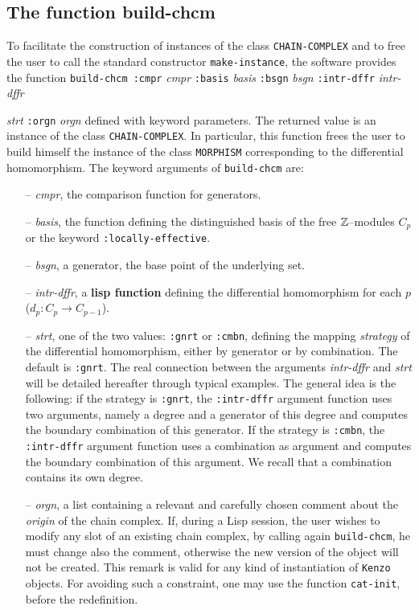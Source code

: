 \subsection {The function build-chcm}

To facilitate the construction of instances of the class {\tt CHAIN-COMPLEX} and to free the user to call
the standard constructor {\tt make-instance}, the software provides the function
\vskip 0.35cm
{\tt build-chcm :cmpr} {\em cmpr} {\tt :basis} {\em basis} {\tt :bsgn} {\em bsgn} {\tt :intr-dffr} {\em intr-dffr} \par
\hspace*{22.5mm}{\tt :strt} {\em strt} {\tt :orgn} {\em orgn}
\vskip 0.35cm
defined with keyword parameters. The returned value is an instance of the class {\tt CHAIN-COMPLEX}.
In particular, this function frees the user to build himself
the   instance of the class {\tt MORPHISM} corresponding to the differential homomorphism.
The keyword arguments of {\tt build-chcm} are:
\begin{itemize}
\item [--] {\em cmpr}, the comparison function for generators.
\item [--] {\em basis}, the function defining the distinguished  basis of the free
${\mathbb{Z}}$--modules $C_p$ or the keyword {\tt :locally-effective}.
\item [--] {\em bsgn}, a generator, the base point of the underlying set.
\item [--] {\em intr-dffr}, a {\bf lisp function} defining the differential homomorphism for each $p$
($d_p : C_p \rightarrow C_{p-1}$).
\item [--] {\em strt}, one of the two values: {\tt :gnrt} or {\tt :cmbn}, defining the
mapping {\em strategy} of the differential homomorphism, either by generator or by combination.
The default is {\tt :gnrt}. The real connection between the  arguments {\em intr-dffr} and {\em strt}
will be detailed hereafter through typical examples. The general idea is the following: if the
strategy is  {\tt :gnrt}, the {\tt :intr-dffr} argument function  uses two arguments, namely
a degree and a generator of this degree and computes the boundary combination of this generator.
If the strategy is  {\tt :cmbn}, the {\tt :intr-dffr} argument function uses a combination as argument
and computes the boundary combination of this argument. We recall that a combination contains
its own degree.
\item [--] {\em orgn}, a list containing  a relevant and carefully chosen  comment
about the {\em origin} of the chain complex. If, during a Lisp session, the user wishes to  modify any slot
of an existing chain complex, by calling again {\tt build-chcm},
he must change also the comment, otherwise the new version of the object will not be created. This
remark is valid for any kind of instantiation of {\tt Kenzo} objects.
For avoiding such a constraint, one may use  the function {\tt cat-init}, before the redefinition.

\end{itemize}

